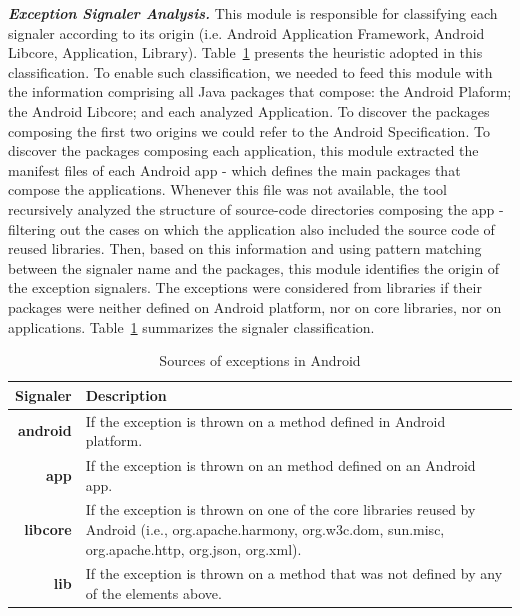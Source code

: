\documentclass[conference]{IEEEtran}
\begin{document}
\emph{\textbf{Exception Signaler Analysis.}}
This module is responsible for classifying each signaler according 
to its origin (i.e. Android Application Framework, Android Libcore, Application, Library). 
Table~\ref{tab:signalers} presents the heuristic adopted in this classification.
To enable such classification, we needed to feed this module with the information
comprising all Java packages that compose: the Android Plaform;
 the Android Libcore; and each analyzed Application. 
To discover the packages composing the first two origins
we could refer to the Android Specification.
To discover the packages composing each application, this module 
extracted the manifest files of each Android app
 - which defines the main packages that compose the applications.
 Whenever this file was not available, the tool recursively analyzed the 
structure of source-code directories composing the app
- filtering out the cases on which the application 
also included the source code of reused libraries.
Then, based on this information and using pattern matching 
between the signaler name and the packages, this module identifies 
the origin of the exception signalers. The exceptions were considered
 from libraries if their packages were neither defined 
on Android platform, nor on core libraries, nor on applications.
Table~\ref{tab:signalers} summarizes the signaler classification.


\begin{table}
  \centering
  \begin{tabular}{rp{29em}}
    \hline
    \bfseries{Signaler} & \bfseries{Description} \\
    \hline
    \bfseries{android} & If the exception is thrown on a method defined in Android platform.\\
    \bfseries{app}     & If the exception is thrown on an method defined on an Android app.\\
    \bfseries{libcore} & If the exception is thrown on one of the core libraries reused by Android (i.e., org.apache.harmony, org.w3c.dom, sun.misc, org.apache.http, org.json, org.xml). \\
    \bfseries{lib}     & If the exception is thrown on a method that was not defined by any of the elements above.\\
    \hline
  \end{tabular}
  \caption{Sources of exceptions in Android}
  \label{tab:signalers}
\end{table}
\end{document}
